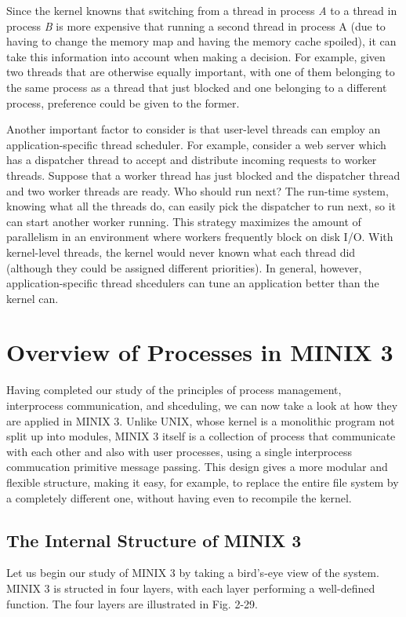 \documentclass{book}
\newcommand {\sys} [1] {\textsl{#1}}
\begin{document}
Since the kernel knowns that switching from a thread in process \sys{A} to a thread in process \sys{B} is more expensive 
that running a second thread in process A (due to having to change the memory map and having the memory cache spoiled),
it can take this information into account when making a decision.
For example, given two threads that are otherwise equally important, with one of them belonging to the same process as a thread that just blocked
and one belonging to a different process, preference could be given to the former.

Another important factor to consider is that user-level threads can employ an application-specific thread scheduler.
For example, consider a web server which has a dispatcher thread to accept and distribute incoming requests to worker threads.
Suppose that a worker thread has just blocked and the dispatcher thread and two worker threads are ready.
Who should run next?
The run-time system, knowing what all the threads do, can easily pick the dispatcher to run next,
so it can start another worker running.
This strategy maximizes the amount of parallelism in an environment where workers frequently block on disk I/O.
With kernel-level threads, the kernel would never known what each thread did (although they could be assigned different priorities).
In general, however, application-specific thread shcedulers can tune an application better than the kernel can.

\section{Overview of Processes in MINIX 3}
Having completed our study of the principles of process management, interprocess communication, and shceduling, 
we can now take a look at how they are applied in MINIX 3.
Unlike UNIX, whose kernel is a monolithic program not split up into modules, 
MINIX 3 itself is a collection of process that communicate with each other and also with user processes,
using a single interprocess commucation primitive message passing.
This design gives a more modular and flexible structure, making it easy,
for example, to replace the entire file system by a completely different one,
without having even to recompile the kernel.

\subsection{The Internal Structure of MINIX 3}
Let us begin our study of MINIX 3 by taking a bird's-eye view of the system.
MINIX 3 is structed in four layers, with each layer performing a well-defined function.
The four layers are illustrated in Fig. 2-29.
\end{document}
